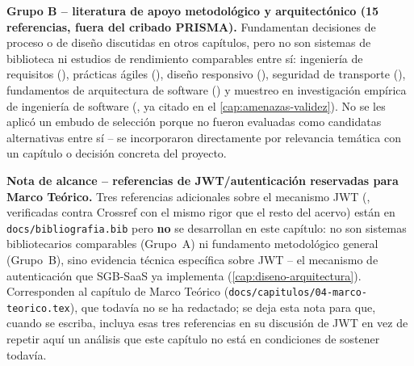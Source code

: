 \textbf{Grupo B -- literatura de apoyo metodológico y arquitectónico (15
referencias, fuera del cribado PRISMA).} Fundamentan decisiones de
proceso o de diseño discutidas en otros capítulos, pero no son sistemas
de biblioteca ni estudios de rendimiento comparables entre sí:
ingeniería de requisitos (\citet{bano2019elicitation,
palomares2021elicitation, yu1997istar, kurtanovic2017classifying}),
prácticas ágiles (\citet{truong2025personality, rahman2024agile}),
diseño responsivo (\citet{parlakkilic2022responsive,
aienobe2025responsive}), seguridad de transporte
(\citet{mckay2019tls}), fundamentos de arquitectura de software
(\citet{sommerville2011se, fowler2002poeaa, walls2022springinaction,
bass2021softwarearch, brown2023c4model}) y muestreo en investigación
empírica de ingeniería de software (\citet{baltes2022sampling}, ya
citado en el \autoref{cap:amenazas-validez}). No se les aplicó un
embudo de selección porque no fueron evaluadas como candidatas
alternativas entre sí -- se incorporaron directamente por relevancia
temática con un capítulo o decisión concreta del proyecto.

\textbf{Nota de alcance -- referencias de JWT/autenticación reservadas
para Marco Teórico.} Tres referencias adicionales sobre el mecanismo
JWT (\citet{bucko2023jwtbehavior, shatnawi2024pythonjwt,
ahmed2019jwtscheme}, verificadas contra Crossref con el mismo rigor que
el resto del acervo) están en \texttt{docs/bibliografia.bib} pero
\textbf{no} se desarrollan en este capítulo: no son sistemas
bibliotecarios comparables (Grupo~A) ni fundamento metodológico general
(Grupo~B), sino evidencia técnica específica sobre JWT -- el mecanismo
de autenticación que SGB-SaaS ya implementa
(\autoref{cap:diseno-arquitectura}). Corresponden al capítulo de Marco
Teórico (\texttt{docs/capitulos/04-marco-teorico.tex}), que todavía no
se ha redactado; se deja esta nota para que, cuando se escriba, incluya
esas tres referencias en su discusión de JWT en vez de repetir aquí un
análisis que este capítulo no está en condiciones de sostener todavía.

